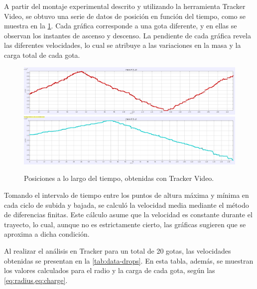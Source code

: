 A partir del montaje experimental descrito y utilizando la herramienta Tracker
Video, se obtuvo una serie de datos de posición en función del tiempo, como se
muestra en la \cref{fig:position}.
Cada gráfica corresponde a una gota diferente, y en ellas se observan los
instantes de ascenso y descenso.
La pendiente de cada gráfica revela las diferentes velocidades, lo cual se
atribuye a las variaciones en la masa y la carga total de cada gota.

\begin{figure}[t]
	\centering
	\includegraphics[width=0.8\linewidth]{./images/positon-drop-tracker-00.png}
	\includegraphics[width=0.8\linewidth]{./images/positon-drop-tracker-01.png}
	\caption{Posiciones a lo largo del tiempo, obtenidas con Tracker Video.}
	\label{fig:position}
\end{figure}

Tomando el intervalo de tiempo entre los puntos de altura máxima y mínima en
cada ciclo de subida y bajada, se calculó la velocidad media mediante el método
de diferencias finitas.
Este cálculo asume que la velocidad es constante durante el trayecto, lo cual,
aunque no es estrictamente cierto, las gráficas sugieren que se aproxima a
dicha condición.

Al realizar el análisis en Tracker para un total de 20 gotas, las velocidades
obtenidas se presentan en la \cref{tab:data-drops}.
En esta tabla, además, se muestran los valores calculados para el radio y la
carga de cada gota, según las \cref{eq:radius,eq:charge}.

